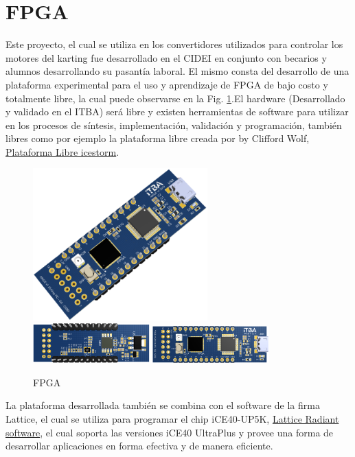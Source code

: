 \documentclass[a4]{article}
\begin{document}
\section{FPGA}
Este proyecto, el cual se utiliza en los convertidores utilizados para controlar los motores del karting fue desarrollado en el CIDEI en conjunto con becarios y alumnos desarrollando su pasantía laboral.
El mismo consta del desarrollo de una plataforma experimental para el uso y aprendizaje de FPGA de bajo costo y totalmente libre, la cual puede observarse en la Fig. \ref{fig:fpga}.El hardware (Desarrollado y validado en el ITBA) será libre y existen herramientas de software para utilizar en los procesos de síntesis, implementación, validación y programación, también libres como por ejemplo la plataforma libre creada por by Clifford Wolf, \href{http://www.clifford.at/icestorm/}{Plataforma Libre icestorm}.
%
\begin{figure}[h]
    \centering
    \includegraphics[width=0.6\textwidth]{figs/fpga1.png}
    \includegraphics[width=0.4\textwidth]{figs/fpga2.png}
    \includegraphics[width=0.4\textwidth]{figs/fpga3.png}
    \caption{FPGA}
    \label{fig:fpga}
\end{figure}

La plataforma desarrollada también se combina con el software de la firma Lattice, el cual se utiliza para programar el chip iCE40-UP5K,  \href{http://www.latticesemi.com/Products/DesignSoftwareAndIP/FPGAandLDS/Radiant}{Lattice Radiant software}, el cual soporta las versiones iCE40 UltraPlus y provee una forma de desarrollar aplicaciones en forma efectiva y de manera eficiente. 
\end{document}
